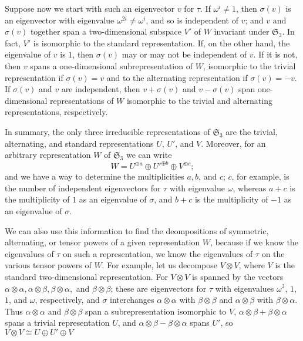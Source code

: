 Suppose now we start with such an eigenvector $v$ for $\tau$. If $\omega^i \neq 1$, then $\sigma(v)$ is an eigenvector with eigenvalue $\omega^{2i}\neq \omega^i$, and so is independent of $v$; and $v$ and $\sigma(v)$ together span a two-dimensional subspace $V'$ of $W$ invariant under $\mathfrak{S}_3$. In fact, $V'$ is isomorphic to the standard representation. If, on the other hand, the eigenvalue of $v$ is $1$, then $\sigma(v)$ may or may not be independent of $v$. If it is not, then $v$ spans a one-dimensional subrepresentation of $W$, isomorphic to the trivial representation if $\sigma(v) = v$ and to the alternating representation if $\sigma(v) = -v$. If $\sigma(v)$ and $v$ are independent, then $v+\sigma(v)$ and $v-\sigma(v)$ span one-dimensional representations of $W$ isomorphic to the trivial and alternating representations, respectively.

In summary, the only three irreducible representations of $\mathfrak{S}_3$ are the trivial, alternating, and standard representations $U$, $U'$, and $V$. Moreover, for an arbitrary representation $W$ of $\mathfrak{S}_3$ we can write \begin{equation*}
    W = U^{\oplus a}\oplus {U'}^{\oplus b}\oplus V^{\oplus c};
\end{equation*}
and we have a way to determine the multiplicities $a,b$, and $c$; $c$, for example, is the number of independent eigenvectors for $\tau$ with eigenvalue $\omega$, whereas $a+c$ is the multiplicity of $1$ as an eigenvalue of $\sigma$, and $b+c$ is the multiplicity of $-1$ as an eigenvalue of $\sigma$. 

We can also use this information to find the deompositions of symmetric, alternating, or tensor powers of a given representation $W$, because if we know the eigenvalues of $\tau$ on such a representation, we know the eigenvalues of $\tau$ on the various tensor powers of $W$. For example, let us decompose $V\otimes V$, where $V$ is the standard two-dimensional representation. For $V\otimes V$ is spanned by the vectors $\alpha\otimes\alpha,\alpha\otimes\beta,\beta\otimes\alpha,$ and $\beta\otimes \beta$; these are eigenvectors for $\tau$ with eigenvalues $\omega^2$, $1$, $1$, and $\omega$, respectively, and $\sigma$ interchanges $\alpha\otimes\alpha$ with $\beta\otimes\beta$ and $\alpha\otimes\beta$ with $\beta\otimes \alpha$. Thus $\alpha\otimes\alpha$ and $\beta\otimes \beta$ span a subrepresentation isomorphic to $V$, $\alpha\otimes \beta+\beta\otimes\alpha$ spans a trivial representation $U$, and $\alpha\otimes\beta-\beta\otimes\alpha$ spans $U'$, so $V\otimes V\cong U\oplus U'\oplus V$
